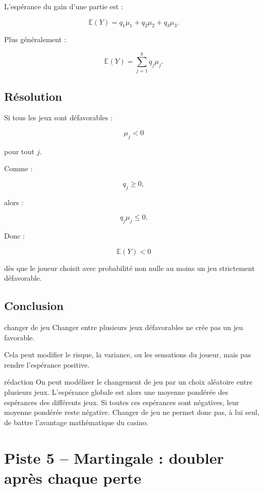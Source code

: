\documentclass[11pt,a4paper]{article}
\newcommand{\E}{\mathbb{E}}
\begin{document}
L'espérance du gain d'une partie est :

\[
\E(Y)=q_1\mu_1+q_2\mu_2+q_3\mu_3.
\]

Plus généralement :

\[
\E(Y)=\sum_{j=1}^{k}q_j\mu_j.
\]

\subsection{Résolution}

Si tous les jeux sont défavorables :

\[
\mu_j<0
\]

pour tout $j$.

Comme :

\[
q_j\geq 0,
\]

alors :

\[
q_j\mu_j\leq 0.
\]

Donc :

\[
\E(Y)<0
\]

dès que le joueur choisit avec probabilité non nulle au moins un jeu strictement défavorable.

\subsection{Conclusion}

\begin{conclusionbox}{changer de jeu}
Changer entre plusieurs jeux défavorables ne crée pas un jeu favorable.

Cela peut modifier le risque, la variance, ou les sensations du joueur, mais pas rendre l'espérance positive.
\end{conclusionbox}

\begin{oral}{rédaction}
On peut modéliser le changement de jeu par un choix aléatoire entre plusieurs jeux. L'espérance globale est alors une moyenne pondérée des espérances des différents jeux. Si toutes ces espérances sont négatives, leur moyenne pondérée reste négative. Changer de jeu ne permet donc pas, à lui seul, de battre l'avantage mathématique du casino.
\end{oral}

\section{Piste 5 -- Martingale : doubler après chaque perte}
\end{document}
